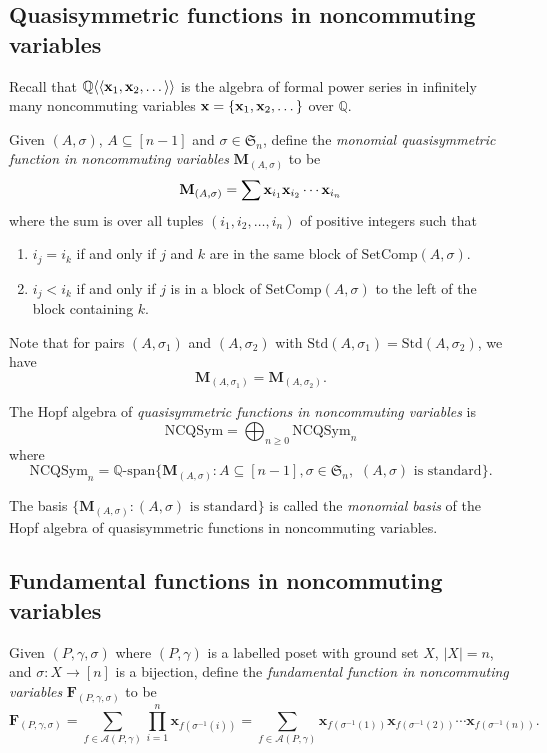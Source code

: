 \documentclass[11pt]{amsart}
\newtheorem{Definition}[Theorem]{Definition}
\numberwithin{equation}{section}
\newcommand{\NCQSym}{\mathrm{NCQSym}}
\newcommand{\SetComp}{\mathrm{SetComp}}
\newcommand{\std}{\mathrm{Std}}
\newcommand{\bM}{\mathbf{M}}
\newcommand{\bx}{{\bf x}}
\newcommand{\bbQ}{{\mathbb{Q}}}
\newcommand{\bfM}{{\mathbf{M}}}
\begin{document}
\subsection{Quasisymmetric functions in noncommuting variables}\label{subsec:NCQSym}



Recall that $\bbQ\langle \langle \bx_1,\bx_2,\dots\rangle\rangle$ is the algebra of formal power series in infinitely many noncommuting variables $\bx=\{\bx_1,\bx_2,\dots\}$ over $\bbQ$. 

Given $(A,\sigma)$, $A\subseteq [n-1]$ and $\sigma\in \mathfrak{S}_n$, define the \emph{monomial quasisymmetric function in noncommuting variables} $\bfM_{(A,\sigma)}$ to be  
$$\bfM_{(A,\sigma)}=\sum \bx_{i_1}\bx_{i_2}\cdots \bx_{i_n}$$ where the sum is over all tuples $(i_1,i_2,\dots,i_n)$ of positive integers such that 
\begin{enumerate} 
\item $i_j=i_k$ if and only if $j$ and $k$ are in the same block of $\SetComp(A,\sigma)$.
\item $i_j<i_k$ if and only if $j$ is in a block of $\SetComp(A,\sigma)$ to the left of the block containing $k$.
\end{enumerate} 

Note that for pairs $(A,\sigma_1)$ and $(A,\sigma_2)$ with $\std(A,\sigma_1)=\std(A,\sigma_2)$, we have 
 $$\bM_{(A,\sigma_1)}=\bM_{(A,\sigma_2)}.$$


The Hopf algebra of \emph{quasisymmetric functions in noncommuting variables} is  
$$\NCQSym=\displaystyle\bigoplus_{n\geq 0}\NCQSym_n$$
where
$$\NCQSym_n=\mathbb{Q}\text{-span}\{ \bM_{(A,\sigma)}: A\subseteq [n-1], \sigma\in \mathfrak{S}_n, \text{~$(A,\sigma)$ is standard}  \}.$$

The basis $\{ \bM_{(A,\sigma)}:\text{$(A,\sigma)$ is standard}\}$ is called the \emph{monomial basis} of the Hopf algebra of quasisymmetric functions in noncommuting variables.

 
 \subsection{Fundamental functions in noncommuting variables}\label{subsec:fund-fun}
Given $(P,\gamma,\sigma)$ where $(P,\gamma)$ is a labelled poset with ground set $X$, $|X|=n$, and $\sigma:X\to[n]$ is a bijection, define the \emph{fundamental function  in noncommuting variables} $\mathbf{F}_{(P,\gamma,\sigma)}$ to be
$$\mathbf{F}_{(P,\gamma,\sigma)}=\sum_{f\in\mathcal{A}(P,\gamma)}\prod_{i=1}^{n}\mathbf{x}_{f(\sigma^{-1}(i))}=\sum_{f\in\mathcal{A}(P,\gamma)}\mathbf{x}_{f(\sigma^{-1}(1))}\mathbf{x}_{f(\sigma^{-1}(2))}\cdots \mathbf{x}_{f(\sigma^{-1}(n))}.$$
\end{document}
